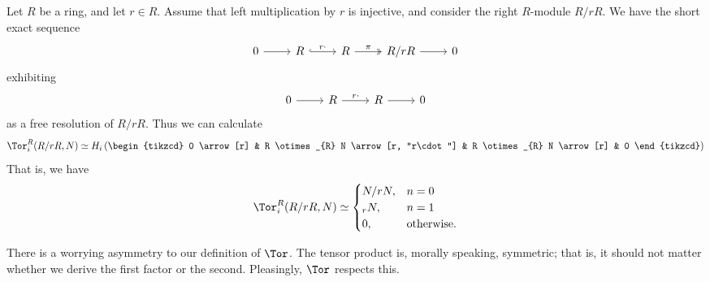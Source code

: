 \documentclass[main.tex]{subfiles}
\begin{document}
\begin{example}
  Let $R$ be a ring, and let $r \in R$. Assume that left multiplication by $r$ is injective, and consider the right $R$-module $R/rR$. We have the short exact sequence
  \begin{equation*}
    \begin{tikzcd}
      0
      \arrow[r]
      & R
      \arrow[r, hookrightarrow, "r\cdot"]
      & R
      \arrow[r, twoheadrightarrow, "\pi"]
      & R/rR
      \arrow[r]
      & 0
    \end{tikzcd}
  \end{equation*}
  exhibiting
  \begin{equation*}
    \begin{tikzcd}
      0
      \arrow[r]
      & R
      \arrow[r, "r\cdot"]
      & R
      \arrow[r]
      & 0
    \end{tikzcd}
  \end{equation*}
  as a free resolution of $R/rR$. Thus we can calculate
  \begin{equation*}
    \Tor^{R}_{i}(R/rR, N) \simeq H_{i}
    \left(
    \begin{tikzcd}
      0
      \arrow[r]
      & R \otimes_{R} N
      \arrow[r, "r\cdot"]
      & R \otimes_{R} N
      \arrow[r]
      & 0
    \end{tikzcd}
    \right)
  \end{equation*}
  That is, we have
  \begin{equation*}
    \Tor^{R}_{i}(R/rR, N) \simeq
    \begin{cases}
      N/rN, & n = 0 \\
      _{r}N, & n = 1 \\
      0, &\text{otherwise}.
    \end{cases}
  \end{equation*}
\end{example}

There is a worrying asymmetry to our definition of $\Tor$. The tensor product is, morally speaking, symmetric; that is, it should not matter whether we derive the first factor or the second. Pleasingly, $\Tor$ respects this.
\end{document}
